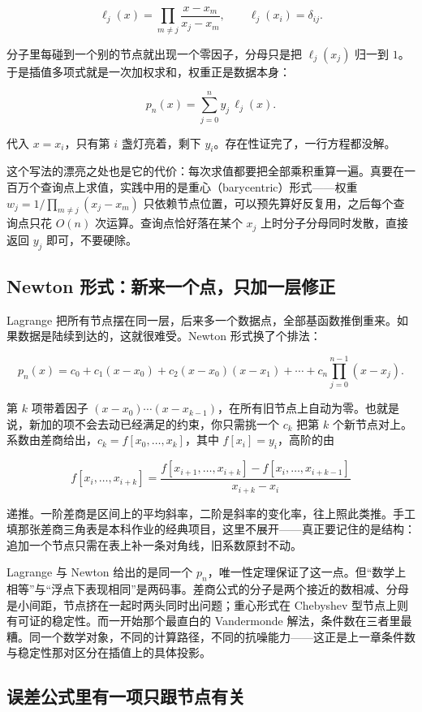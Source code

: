 \[
\ell_j(x)=\prod_{m\ne j}\frac{x-x_m}{x_j-x_m},
\qquad \ell_j(x_i)=\delta_{ij}.
\]

分子里每碰到一个别的节点就出现一个零因子，分母只是把 \(\ell_j(x_j)\) 归一到 \(1\)。于是插值多项式就是一次加权求和，权重正是数据本身：

\[
p_n(x)=\sum_{j=0}^{n}y_j\,\ell_j(x).
\]

代入 \(x=x_i\)，只有第 \(i\) 盏灯亮着，剩下 \(y_i\)。存在性证完了，一行方程都没解。

这个写法的漂亮之处也是它的代价：每次求值都要把全部乘积重算一遍。真要在一百万个查询点上求值，实践中用的是重心（barycentric）形式——权重 \(w_j=1/\prod_{m\ne j}(x_j-x_m)\) 只依赖节点位置，可以预先算好反复用，之后每个查询点只花 \(O(n)\) 次运算。查询点恰好落在某个 \(x_j\) 上时分子分母同时发散，直接返回 \(y_j\) 即可，不要硬除。

\subsection{Newton 形式：新来一个点，只加一层修正}

Lagrange 把所有节点摆在同一层，后来多一个数据点，全部基函数推倒重来。如果数据是陆续到达的，这就很难受。Newton 形式换了个排法：

\[
p_n(x)=c_0+c_1(x-x_0)+c_2(x-x_0)(x-x_1)+\cdots+c_n\prod_{j=0}^{n-1}(x-x_j).
\]

第 \(k\) 项带着因子 \((x-x_0)\cdots(x-x_{k-1})\)，在所有旧节点上自动为零。也就是说，新加的项不会去动已经满足的约束，你只需挑一个 \(c_k\) 把第 \(k\) 个新节点对上。系数由差商给出，\(c_k=f[x_0,\dots,x_k]\)，其中 \(f[x_i]=y_i\)，高阶的由

\[
f[x_i,\dots,x_{i+k}]=\frac{f[x_{i+1},\dots,x_{i+k}]-f[x_i,\dots,x_{i+k-1}]}{x_{i+k}-x_i}
\]

递推。一阶差商是区间上的平均斜率，二阶是斜率的变化率，往上照此类推。手工填那张差商三角表是本科作业的经典项目，这里不展开——真正要记住的是结构：追加一个节点只需在表上补一条对角线，旧系数原封不动。

Lagrange 与 Newton 给出的是同一个 \(p_n\)，唯一性定理保证了这一点。但``数学上相等''与``浮点下表现相同''是两码事。差商公式的分子是两个接近的数相减、分母是小间距，节点挤在一起时两头同时出问题；重心形式在 Chebyshev 型节点上则有可证的稳定性。而一开始那个最直白的 Vandermonde 解法，条件数在三者里最糟。同一个数学对象，不同的计算路径，不同的抗噪能力——这正是上一章条件数与稳定性那对区分在插值上的具体投影。

\subsection{误差公式里有一项只跟节点有关}

